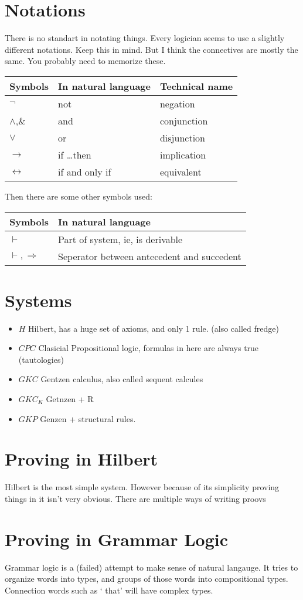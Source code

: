 \documentclass{article}
\begin{document}
\section{Notations}
\label{notations}
There is no standart in notating things. Every logician seems to use a
slightly different notations. Keep this in mind. But I think the connectives
are mostly the same. You probably need to memorize these.

\noindent
\begin{tabular}{@{}lll@{}}
Symbols&
In natural language &
Technical name \\ \toprule
$\neg$ 			& not 				& negation \\
$\wedge$,\& 	& and 				& conjunction \\
$\vee$ 			& or 				& disjunction\\
$\to$	& if \ldots then 	& implication\\
$\leftrightarrow$	& if and only if 	& equivalent\\ \bottomrule
\end{tabular}


Then there are some other symbols used:

\noindent
\begin{tabular}{@{}ll@{}}
Symbols&
In natural language \\ \toprule
$\vdash$ 					& Part of system, ie, is derivable \\
$\vdash, \Rightarrow$ 		& Seperator between antecedent and succedent\\ \bottomrule
\end{tabular}


\section{Systems}
\begin{itemize}
	\item $H$  Hilbert, has a huge set of axioms, and only 1 rule. (also called fredge)
	\item $CPC$ Clasicial Propositional logic, formulas in here are always true
(tautologies)
	\item $GKC$ Gentzen calculus, also called sequent calcules
	\item $GKC_K$  Getnzen + R 
	\item $GKP$ Genzen + structural rules.
\end{itemize}

\section{Proving in Hilbert}
Hilbert is the most simple system. However because of its simplicity proving
things in it isn't very obvious. There are multiple ways of writing proovs

\section{Proving in Grammar Logic}
Grammar logic is a (failed) attempt to make sense of natural langauge. It
tries to organize words into types, and groups of those words into compositional
types.
Connection words such as ` that' will have complex types.
\end{document}
